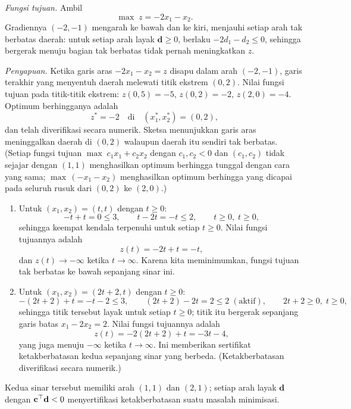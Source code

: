 \emph{Fungsi tujuan.} Ambil
\[
\max\; z = -2x_1 - x_2.
\]
Gradiennya $(-2,-1)$ mengarah ke bawah dan ke kiri, menjauhi setiap arah tak berbatas daerah: untuk setiap arah layak $\mathbf d \geq 0$, berlaku $-2d_1 - d_2 \leq 0$, sehingga bergerak menuju bagian tak berbatas tidak pernah meningkatkan $z$.

\emph{Penyapuan.} Ketika garis aras $-2x_1 - x_2 = z$ disapu dalam arah $(-2,-1)$, garis terakhir yang menyentuh daerah melewati titik ekstrem $(0,2)$. Nilai fungsi tujuan pada titik-titik ekstrem: $z(0,5) = -5$, $z(0,2) = -2$, $z(2,0) = -4$. Optimum berhingganya adalah
\[
z^* = -2 \quad \text{di} \quad (x_1^*, x_2^*) = (0, 2),
\]
dan telah diverifikasi secara numerik. Sketsa menunjukkan garis aras meninggalkan daerah di $(0,2)$ walaupun daerah itu sendiri tak berbatas. (Setiap fungsi tujuan $\max\; c_1 x_1 + c_2 x_2$ dengan $c_1, c_2 < 0$ dan $(c_1,c_2)$ tidak sejajar dengan $(1,1)$ menghasilkan optimum berhingga tunggal dengan cara yang sama; $\max\, (-x_1 - x_2)$ menghasilkan optimum berhingga yang dicapai pada seluruh rusuk dari $(0,2)$ ke $(2,0)$.)

\begin{enumerate}
\item Untuk $(x_1, x_2) = (t, t)$ dengan $t \geq 0$:
\[
-t + t = 0 \leq 3, \qquad t - 2t = -t \leq 2, \qquad t \geq 0,\; t \geq 0,
\]
sehingga keempat kendala terpenuhi untuk setiap $t \geq 0$. Nilai fungsi tujuannya adalah
\[
z(t) = -2t + t = -t,
\]
dan $z(t) \to -\infty$ ketika $t \to \infty$. Karena kita meminimumkan, fungsi tujuan tak berbatas ke bawah sepanjang sinar ini.
\item Untuk $(x_1, x_2) = (2t + 2, t)$ dengan $t \geq 0$:
\[
-(2t+2) + t = -t - 2 \leq 3, \qquad (2t + 2) - 2t = 2 \leq 2 \;(\text{aktif}), \qquad 2t + 2 \geq 0,\; t \geq 0,
\]
sehingga titik tersebut layak untuk setiap $t \geq 0$; titik itu bergerak sepanjang garis batas $x_1 - 2x_2 = 2$. Nilai fungsi tujuannya adalah
\[
z(t) = -2(2t + 2) + t = -3t - 4,
\]
yang juga menuju $-\infty$ ketika $t \to \infty$. Ini memberikan sertifikat ketakberbatasan kedua sepanjang sinar yang berbeda. (Ketakberbatasan diverifikasi secara numerik.)
\end{enumerate}
Kedua sinar tersebut memiliki arah $(1,1)$ dan $(2,1)$; setiap arah layak $\mathbf d$ dengan $\mathbf{c}^\top \mathbf d < 0$ menyertifikasi ketakberbatasan suatu masalah minimisasi.

